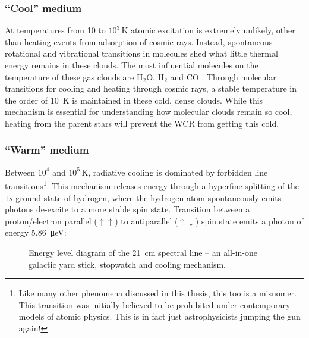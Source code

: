 \subsubsection{``Cool'' medium}

At temperatures from 10 to $10^3 \, \si{\kelvin}$ atomic excitation is extremely unlikely, other than heating events from adsorption of cosmic rays.
Instead, spontaneous rotational and vibrational transitions in molecules shed what little thermal energy remains in these clouds.
The most influential molecules on the temperature of these gas clouds are $\text{H}_2 \text{O}$, $\text{H}_2$ and $\text{CO}$
\parencite{neufeldRadiativeCoolingWarm1993,neufeldThermalBalanceDense1995}.
Through molecular transitions for cooling and heating through cosmic rays, a stable temperature in the order of \SI{10}{\kelvin} is maintained in these cold, dense clouds.
While this mechanism is essential for understanding how molecular clouds remain so cool, heating from the parent stars will prevent the WCR from getting this cold.

\subsubsection{``Warm'' medium}

Between $10^4$ and $10^5 \, \si{\kelvin}$, radiative cooling is dominated by forbidden line transitions\footnote{Like many other phenomena discussed in this thesis, this too is a misnomer. This transition was initially believed to be prohibited under contemporary models of atomic physics. This is in fact just astrophysicists jumping the gun again!}.
This mechanism releases energy through a hyperfine splitting of the $1s$ ground state of hydrogen, where the hydrogen atom spontaneously emits photons de-excite to a more stable spin state.
Transition between a proton/electron parallel ($\uparrow\uparrow$) to antiparallel ($\uparrow\downarrow$) spin state emits a photon of energy \SI{5.86}{\micro\electronvolt}:

\begin{figure}[H]
  \caption[The \SI{21}{cm} spectral line]{Energy level diagram of the \SI{21}{cm} spectral line -- an all-in-one galactic yard stick, stopwatch and cooling mechanism.}
  \label{fig:quiver-h}
\end{figure}

